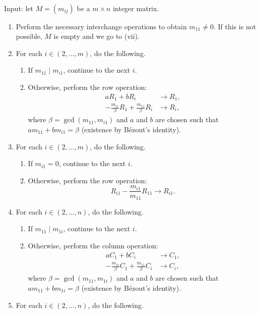 \begin{algorithm}
	\hspace{0em} \\
	Input: let $M = (m_{ij})$ be a $m \times n$ integer matrix.
	\begin{enumerate}
		\item Perform the necessary interchange operations to obtain $m_{11} \neq 0$. If this is not possible, $M$ is empty and we go to (vii).
		\item For each $i \in (2, \ldots, m)$, do the following.
		\begin{enumerate}
			\item If $m_{11} \mid m_{i1}$, continue to the next $i$.
			\item Otherwise, perform the row operation:
			\begin{align*}
				aR_1                     + bR_i 										&\to R_1, \\
				-\frac{m_{i1}}{\beta}R_1 + \frac{m_{11}}{\beta}R_i  &\to R_i,
			\end{align*}
			where $\beta = \gcd(m_{11}, m_{i1})$ and $a$ and $b$ are chosen such that $am_{11} + bm_{i1} = \beta$ (existence by B\'ezout's identity).
		\end{enumerate}
		\item For each $i \in (2, \ldots, m)$, do the following.
		\begin{enumerate}
			\item If $m_{i1} = 0$, continue to the next $i$.
			\item Otherwise, perform the row operation:
				\[ R_{i1} -\frac{m_{i1}}{m_{11}} R_{11} \to R_{i1}. \]
		\end{enumerate}
		\item For each $i \in (2, \ldots, n)$, do the following.
		\begin{enumerate}
			\item If $m_{11} \mid m_{1i}$, continue to the next $i$.
			\item Otherwise, perform the column operation:
			\begin{align*}
				aC_1                     + bC_i 										&\to C_1, \\
				-\frac{m_{1i}}{\beta}C_1 + \frac{m_{11}}{\beta}C_i  &\to C_i,
			\end{align*}
			where $\beta = \gcd(m_{11}, m_{1i})$ and $a$ and $b$ are chosen such that $am_{11} + bm_{1i} = \beta$ (existence by B\'ezout's identity).
		\end{enumerate}
		\item For each $i \in (2, \ldots, n)$, do the following.

\end{enumerate}
\end{algorithm}
